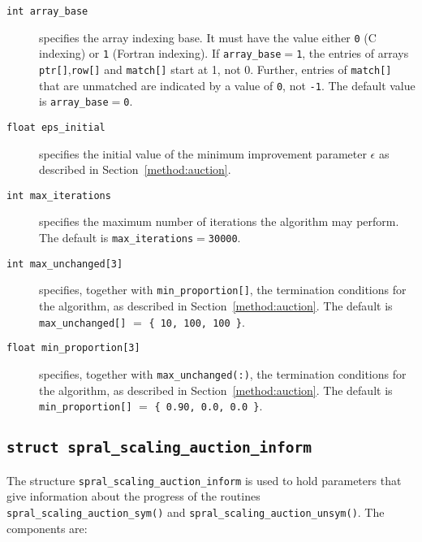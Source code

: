 \begin{description}

\item[\texttt{int array\_base}] specifies the array indexing base. It must
   have the value either \texttt{0} (C indexing) or \texttt{1} (Fortran
   indexing). If \texttt{array\_base}$=$\texttt{1}, the entries of arrays
   \texttt{ptr[]},\texttt{row[]} and \texttt{match[]} start at 1, not 0.
   Further, entries of \texttt{match[]} that are unmatched are indicated by a
   value of \texttt{0}, not \texttt{-1}.
   The default value is \texttt{array\_base}$=$\texttt{0}.

\item[\texttt{float eps\_initial}] specifies the initial value of the minimum improvement parameter $\epsilon$ as described in Section~\ref{method:auction}.

\item[\texttt{int max\_iterations}] specifies the maximum number of iterations the algorithm may perform. The default is \texttt{max\_iterations}$=$\texttt{30000}.

\item[\texttt{int max\_unchanged[3]}] specifies, together with \texttt{min\_proportion[]}, the termination conditions for the algorithm, as described in Section~\ref{method:auction}. The default is \texttt{max\_unchanged[]} $=$ \texttt{\{ 10, 100, 100 \}}.

\item[\texttt{float min\_proportion[3]}] specifies, together with \texttt{max\_unchanged(:)}, the termination conditions for the algorithm, as described in Section~\ref{method:auction}. The default is \texttt{min\_proportion[]} $=$ \texttt{\{ 0.90, 0.0, 0.0 \}}.

\end{description}

\subsection{\texttt{struct spral\_scaling\_auction\_inform}} \label{type:auction_inform}

The structure \texttt{spral\_scaling\_auction\_inform} is used to hold parameters that
give information about the progress of the routines
\texttt{spral\_scaling\_auction\_sym()} and \texttt{spral\_scaling\_auction\_unsym()}. The components are:

